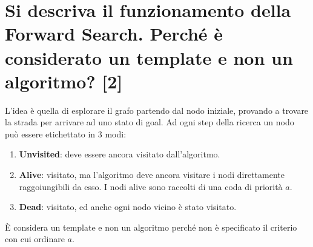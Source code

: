 \documentclass[\main/main.tex]{subfiles}
\begin{document}
\section{Si descriva il funzionamento della Forward Search.  Perché è considerato un template e non un algoritmo? [2]}
L'idea è quella di esplorare il grafo partendo dal nodo iniziale, provando a trovare la strada per arrivare ad uno stato di goal. Ad ogni step della ricerca un nodo può essere etichettato in 3 modi:

\begin{enumerate}
\item \textbf{Unvisited}: deve essere ancora visitato dall'algoritmo.
\item \textbf{Alive}: visitato, ma l'algoritmo deve ancora visitare i nodi direttamente raggoiungibili da esso. I nodi alive sono raccolti di una coda di priorità $a$.
\item \textbf{Dead}: visitato, ed anche ogni nodo vicino è stato visitato.
\end{enumerate}

È considera un template e non un algoritmo perché non è specificato il criterio con cui ordinare $a$.

%
%            
%
\end{document}
